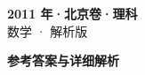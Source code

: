 \documentclass[zihao=-4, a4paper]{ctexart}
\begin{document}
\begin{center}
  {\Large\bfseries 2011 年·北京卷·理科}\\[4pt]
  {\large 数学 · 解析版}
\end{center}
\medskip
{}

\clearpage
{}
\begin{center}{\Large\bfseries 参考答案与详细解析}\end{center}
\medskip

\end{document}
